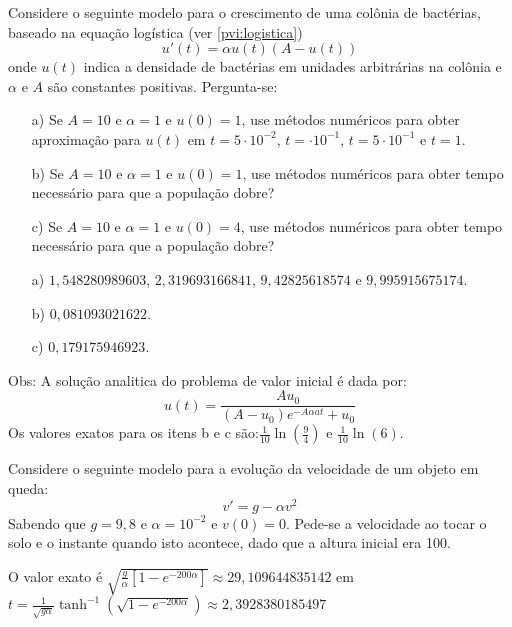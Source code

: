 \begin{exer} Considere o seguinte modelo para o crescimento de uma colônia de bactérias, baseado na equação logística (ver \eqref{pvi:logistica})
$$u'(t)=\alpha u(t) \left(A-u(t)\right)$$
onde $u(t)$ indica a densidade de bactérias em unidades arbitrárias na colônia e $\alpha$ e $A$ são constantes positivas.
Pergunta-se: %
\begin{itemize}
\item[a)] Se $A=10$ e $\alpha=1$ e $u(0)=1$, use métodos numéricos para obter aproximação para $u(t)$ em $t=5\cdot 10^{-2}$, $t=\cdot 10^{-1}$, $t=5\cdot 10^{-1}$ e $t=1$.
\item[b)] Se $A=10$ e $\alpha=1$ e $u(0)=1$, use métodos numéricos para obter tempo necessário para que a população dobre?
\item[c)] Se $A=10$ e $\alpha=1$ e $u(0)=4$, use métodos numéricos para obter tempo necessário para que a população dobre?
\end{itemize}
\end{exer}
\begin{resp}
\begin{itemize}
 \item [a)] $1,548280989603$,   $2,319693166841$,    $9,42825618574$ e  $9,995915675174$.
 \item [b)] $0,081093021622$.
 \item [c)] $0,179175946923$.
 \end{itemize}

Obs: A solução analitica do problema de valor inicial é dada por:
 $$u(t)=\frac{Au_0}{(A-u_0)e^{-A\alpha at}+u_0}$$
 Os valores exatos para os itens b e c são:$\frac{1}{10}\ln\left(\frac{9}{4}\right)$ e $\frac{1}{10}\ln\left(6\right)$. 

\end{resp}

\begin{exer} Considere o seguinte modelo para a evolução da velocidade de um objeto em queda:
$$v'=g-\alpha v^2$$
Sabendo que $g=9,8$ e $\alpha=10^{-2}$ e $v(0)=0$. Pede-se a velocidade ao tocar o solo e o instante quando isto acontece, dado que a altura inicial era 100.
\end{exer}
\begin{resp}
O valor exato é $\sqrt{\frac{g}{\alpha}\left[1-e^{{-200\alpha}}\right]}\approx 29,109644835142$ em $t=\frac{1}{\sqrt{g\alpha}}\tanh^{-1}\left(\sqrt{1-e^{{-200\alpha}}}\right)\approx 2,3928380185497$
\end{resp}



